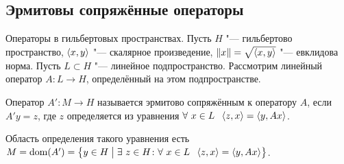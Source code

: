 \subsection{Эрмитовы сопряжённые операторы}
Операторы в гильбертовых пространствах. Пусть $H$ "--- гильбертово пространство, $\langle x,y\rangle $ "--- скалярное произведение, $\|x\| = \sqrt{ \langle x,y\rangle }$ "--- евклидова норма. Пусть $L\subset H$ "--- линейное подпространство. Рассмотрим линейный оператор $A\colon L\to H$, определённый на этом подпространстве.
\begin{Def}
 Оператор $A'\colon M\to H$ называется эрмитово сопряжённым к оператору $A$, если $A'y = z$, где $z$ определяется из уравнения $\forall\ x\in L\pau \la z,x\ra = \la y, Ax\ra$.
\end{Def}
Область определения такого уравнения есть $M = \operatorname{dom}(A') = \big\{y\in H\bigm|\exists\ z\in H\colon \forall\ x\in L\hskip .75em plus.1em minus.08em\relax \langle z,x\rangle = \langle y,Ax\rangle\big\}$.

